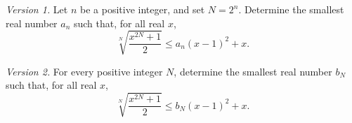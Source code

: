 \textit{Version 1.} Let $n$ be a positive integer, and set $N = 2^n$. Determine the smallest real number $a_n$ such that, for all real $x$,
\[
\sqrt[N]{\frac{x^{2N}+1}{2}} \leqslant a_n(x-1)^2 + x.
\]

\textit{Version 2.} For every positive integer $N$, determine the smallest real number $b_N$ such that, for all real $x$,
\[
\sqrt[N]{\frac{x^{2N}+1}{2}} \leqslant b_N(x-1)^2 + x.
\]
